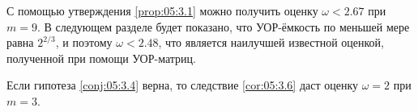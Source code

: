 С помощью утверждения \ref{prop:05:3.1} можно получить оценку $\omega < 2.67$ при $m=9$. В следующем разделе будет показано, что УОР-ёмкость по меньшей мере равна $2^{2/3}$, и поэтому $\omega < 2.48$, что является наилучшей известной оценкой, полученной при помощи УОР-матриц.

Если гипотеза \ref{conj:05:3.4} верна, то следствие \ref{cor:05:3.6} даст оценку $\omega = 2$ при $m=3$.



